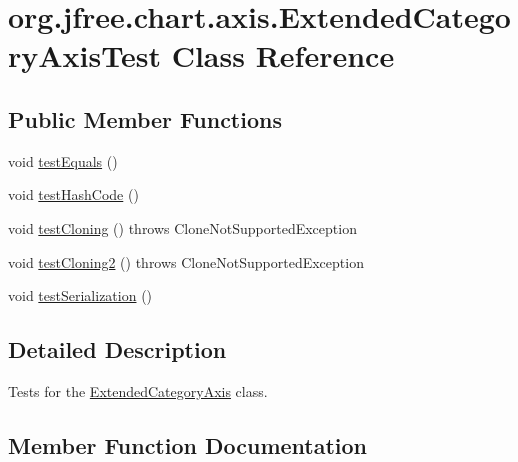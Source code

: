 \hypertarget{classorg_1_1jfree_1_1chart_1_1axis_1_1_extended_category_axis_test}{}\section{org.\+jfree.\+chart.\+axis.\+Extended\+Category\+Axis\+Test Class Reference}
\label{classorg_1_1jfree_1_1chart_1_1axis_1_1_extended_category_axis_test}
\subsection*{Public Member Functions}
\begin{DoxyCompactItemize}
\item 
void \mbox{\hyperlink{classorg_1_1jfree_1_1chart_1_1axis_1_1_extended_category_axis_test_a3683d29a80b0bfd2d8a4c23231ee7d40}{test\+Equals}} ()
\item 
void \mbox{\hyperlink{classorg_1_1jfree_1_1chart_1_1axis_1_1_extended_category_axis_test_a18c5e1fd8cebaa14d9cdcd6e440f1cbc}{test\+Hash\+Code}} ()
\item 
void \mbox{\hyperlink{classorg_1_1jfree_1_1chart_1_1axis_1_1_extended_category_axis_test_a8ca336309af0c733890a78246d6fbb91}{test\+Cloning}} ()  throws Clone\+Not\+Supported\+Exception 
\item 
void \mbox{\hyperlink{classorg_1_1jfree_1_1chart_1_1axis_1_1_extended_category_axis_test_aa465531e0bbabf6d407ef20a4632df3f}{test\+Cloning2}} ()  throws Clone\+Not\+Supported\+Exception 
\item 
void \mbox{\hyperlink{classorg_1_1jfree_1_1chart_1_1axis_1_1_extended_category_axis_test_a7d37143e16ec7a6a8344e8f63ad5b3c0}{test\+Serialization}} ()
\end{DoxyCompactItemize}


\subsection{Detailed Description}
Tests for the \mbox{\hyperlink{classorg_1_1jfree_1_1chart_1_1axis_1_1_extended_category_axis}{Extended\+Category\+Axis}} class. 

\subsection{Member Function Documentation}
\mbox{\label{classorg_1_1jfree_1_1chart_1_1axis_1_1_extended_category_axis_test_a8ca336309af0c733890a78246d6fbb91}} 

